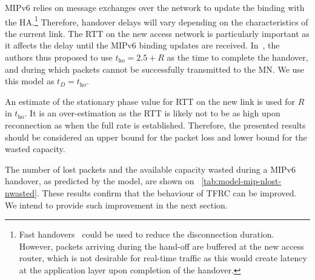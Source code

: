 \documentclass[twocolumn]{nictatechreport}
\begin{document}
MIPv6 relies on message exchanges over the network to update the binding
with the HA.\footnote{Fast handovers~\cite{2001koodli_fast_handover_context_transfer} could be used to reduce
the disconnection duration. However, packets arriving during the hand-off are
buffered at the new access router, which is not desirable for real-time traffic
as this would create latency at the application layer upon completion of the
handover.} Therefore, handover delays will vary depending on the characteristics of
the current link. The RTT on the new access network is particularly important
as it affects the delay until the MIPv6 binding updates are received.
In~\cite{2004lee_mipv6_handoff_analysis}, the authors thus proposed to use $t_\mathrm{ho} = 2.5
+ R$ as the time to complete the handover, and during which packets cannot be
successfully transmitted to the MN. We use this model as $t_D = t_\mathrm{ho}$.

An estimate of the stationary phase value for RTT on the new link is used for
$R$ in $t_\mathrm{ho}$. It is an over-estimation as the RTT is likely not to be
as high upon reconnection as when the full rate is established. Therefore, the
presented results should be considered an upper bound for the packet loss and
lower bound for the wasted capacity.

The number of lost packets and the available capacity wasted during a MIPv6
handover, as predicted by the model, are shown on
\tablename~\ref{tab:model-mip-nlost-nwasted}.  These results confirm that the
behaviour of TFRC can be improved. We intend to provide such improvement in
the next section.
\end{document}

